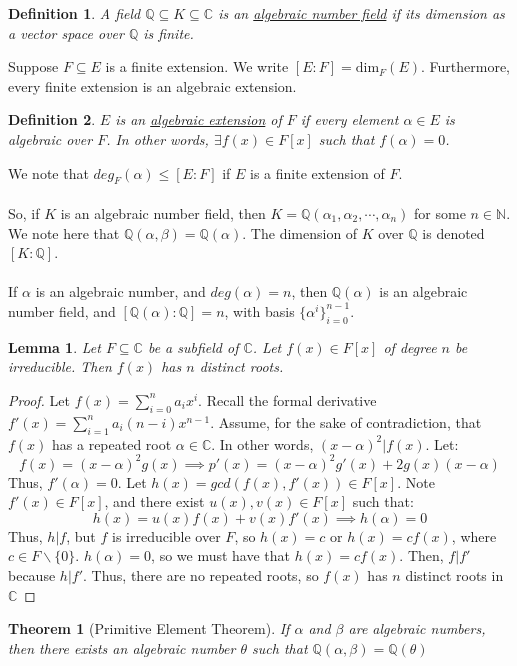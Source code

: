\documentclass{article}
\newcommand{\C}{\mathbb{C}}
\newcommand{\N}{\mathbb{N}}
\newcommand{\Q}{\mathbb{Q}}
\newtheorem{theorem}{Theorem}
\newtheorem{lemma}{Lemma}
\newtheorem{definition}{Definition}
\begin{document}
\begin{definition}
A field $\Q\subseteq K\subseteq \C$ is an \underline{algebraic number field} if its dimension as a vector space over $\Q$ is finite.
\end{definition}
\noindent Suppose $F\subseteq E$ is a finite extension. We write $[E:F]=\text{dim}_F(E)$. Furthermore, every finite extension is an algebraic extension. 
\begin{definition}
$E$ is an \underline{algebraic extension} of $F$ if every element $\alpha\in E$ is algebraic over $F$. In other words, $\exists f(x)\in F[x]$ such that $f(\alpha)=0$.
\end{definition}
\noindent We note that $deg_F(\alpha)\leq [E:F]$ if $E$ is a finite extension of $F$.\\
\\
So, if $K$ is an algebraic number field, then $K=\Q(\alpha_1,\alpha_2,\cdots,\alpha_n)$ for some $n\in\N$. We note here that $\Q(\alpha,\beta)=\Q(\alpha)$. The dimension of $K$ over $\Q$ is denoted $[K:\Q]$.\\
\\
\noindent If $\alpha$ is an algebraic number, and $deg(\alpha)=n$, then $\Q(\alpha)$ is an algebraic number field, and $[\Q(\alpha):\Q]=n$, with basis $\{\alpha^i\}_{i=0}^{n-1}$.
\begin{lemma}
Let $F\subseteq \C$ be a subfield of $\C$. Let $f(x)\in F[x]$ of degree $n$ be irreducible. Then $f(x)$ has $n$ distinct roots.
\end{lemma}
\begin{proof}
Let $f(x)=\displaystyle \sum_{i=0}^n a_ix^i$. Recall the formal derivative $f'(x)=\displaystyle \sum_{i=1}^n a_i(n-i)x^{n-1}$. Assume, for the sake of contradiction, that $f(x)$ has a repeated root $\alpha\in \C$. In other words, $(x-\alpha)^2|f(x)$. Let:
$$f(x)=(x-\alpha)^2g(x)\implies p'(x)=(x-\alpha)^2g'(x)+2g(x)(x-\alpha)$$
Thus, $f'(\alpha)=0$. Let $h(x)=gcd(f(x),f'(x))\in F[x]$. Note $f'(x)\in F[x]$, and there exist $u(x),v(x)\in F[x]$ such that:
$$h(x)=u(x)f(x)+v(x)f'(x)\implies h(\alpha)=0$$
Thus, $h|f$, but $f$ is irreducible over $F$, so $h(x)=c$ or $h(x)=cf(x)$, where $c\in F\backslash \{0\}$. $h(\alpha)=0$, so we must have that $h(x)=cf(x)$. Then, $f|f'$ because $h|f'$. Thus, there are no repeated roots, so $f(x)$ has $n$ distinct roots in $\C$
\end{proof}
\begin{theorem}[Primitive Element Theorem]
If $\alpha$ and $\beta$ are algebraic numbers, then there exists an algebraic number $\theta$ such that $\Q(\alpha,\beta)=\Q(\theta)$
\end{theorem}
\end{document}
